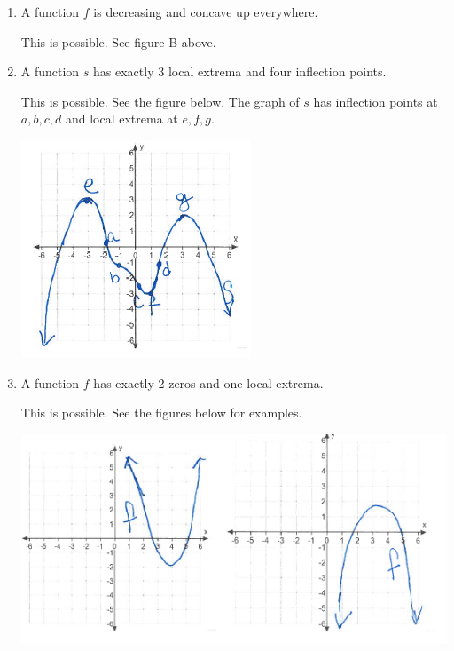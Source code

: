 \documentclass[nooutcomes]{ximera}
\begin{document}
\begin{problem}
\begin{enumerate}
\begin{freeResponse}
	\end{freeResponse}
	\item A function $f$ is decreasing and concave up everywhere.
	\begin{freeResponse}
	This is possible.  See figure B above.
	\end{freeResponse}	
	\item A function $s$ has exactly 3 local extrema and four inflection points.
		\begin{freeResponse}
	This is possible.  See the figure below.  The graph of $s$ has inflection points at $a,b,c,d$ and local extrema at $e,f,g$.
		      \begin{image}
        \includegraphics[scale = 0.5]{figure9.png}
      \end{image}	
	\end{freeResponse}	
	\item A function $f$ has exactly 2 zeros and one local extrema.
  	  		\begin{freeResponse}
	This is possible.  See the figures below for examples.
		      \begin{image}
        \includegraphics[scale = 0.5]{figure10.png}
      \end{image}	
      	\end{freeResponse}	

\end{enumerate}



\end{problem}
\end{document}
